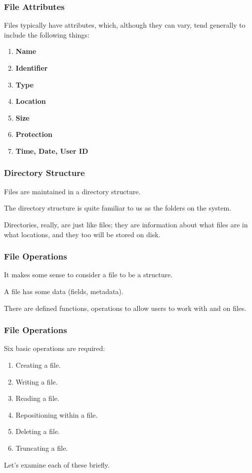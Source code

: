 \begin{frame}
\frametitle{File Attributes}

Files typically have attributes, which, although they can vary, tend generally to include the following things:

\begin{enumerate}
	\item \textbf{Name}
	\item \textbf{Identifier}
	\item \textbf{Type}
	\item \textbf{Location}
	\item \textbf{Size}
	\item \textbf{Protection}
	\item \textbf{Time, Date, User ID}
\end{enumerate}


\end{frame}

\begin{frame}
\frametitle{Directory Structure}

Files are maintained in a directory structure. 

The directory structure is quite familiar to us as the folders on the system. 

Directories, really, are just like files; they are information about what files are in what locations, and they too will be stored on disk.


\end{frame}

\begin{frame}
\frametitle{File Operations}

It makes some sense to consider a file to be a structure. 

A file has some data (fields, metadata).

There are defined functions, operations to allow users to work with and on files. 

\end{frame}

\begin{frame}
\frametitle{File Operations}
Six basic operations are required:

\begin{enumerate}
	\item Creating a file.
	\item Writing a file.
	\item Reading a file.
	\item Repositioning within a file.
	\item Deleting a file.
	\item Truncating a file.
\end{enumerate}

Let's examine each of these briefly.

\end{frame}


